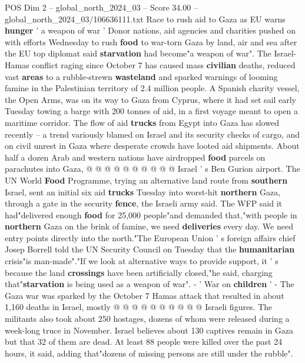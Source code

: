\begin{textsample}{POS Dim 2 – global\_north\_2024\_03 – Score 34.00 – global\_north\_2024\_03/106636111.txt}  \label{ex:f2_pos_103}
Race to rush aid to Gaza as EU warns \textbf{hunger} ' a weapon of war ' Donor nations, aid agencies and charities pushed on with efforts Wednesday to rush \textbf{food} to war-torn Gaza by land, air and sea after the EU top diplomat said \textbf{starvation} had become"a weapon of war".
The Israel-Hamas conflict raging since October 7 has caused mass \textbf{civilian} deaths, reduced vast \textbf{areas} to a rubble-strewn \textbf{wasteland} and sparked warnings of looming famine in the Palestinian territory of 2.4 million people.
A Spanish charity vessel, the Open Arms, was on its way to Gaza from Cyprus, where it had set sail early Tuesday towing a barge with 200 tonnes of aid, in a first voyage meant to open a maritime corridor.
The flow of aid \textbf{trucks} from Egypt into Gaza has slowed recently -- a trend variously blamed on Israel and its security checks of cargo, and on civil unrest in Gaza where desperate crowds have looted aid shipments.
About half a dozen Arab and western nations have airdropped \textbf{food} parcels on parachutes into Gaza, @ @ @ @ @ @ @ @ @ @ Israel ' s Ben Gurion airport.
The UN World \textbf{Food} Programme, trying an alternative land route from \textbf{southern} Israel, sent an initial six aid \textbf{trucks} Tuesday into worst-hit \textbf{northern} Gaza, through a gate in the security \textbf{fence}, the Israeli army said.
The WFP said it had"delivered enough \textbf{food} for 25,000 people"and demanded that,"with people in \textbf{northern} Gaza on the brink of famine, we need \textbf{deliveries} every day.
We need entry points directly into the north."The European Union ' s foreign affairs chief Josep Borrell told the UN Security Council on Tuesday that the \textbf{humanitarian} crisis"is man-made"."If we look at alternative ways to provide support, it ' s because the land \textbf{crossings} have been artificially closed,"he said, charging that"\textbf{starvation} is being used as a weapon of war". - ' War on \textbf{children} ' - The Gaza war was sparked by the October 7 Hamas attack that resulted in about 1,160 deaths in Israel, mostly @ @ @ @ @ @ @ @ @ @ Israeli figures.
The militants also took about 250 hostages, dozens of whom were released during a week-long truce in November.
Israel believes about 130 captives remain in Gaza but that 32 of them are dead.
At least 88 people were killed over the past 24 hours, it said, adding that"dozens of missing persons are still under the rubble".

\end{textsample}
